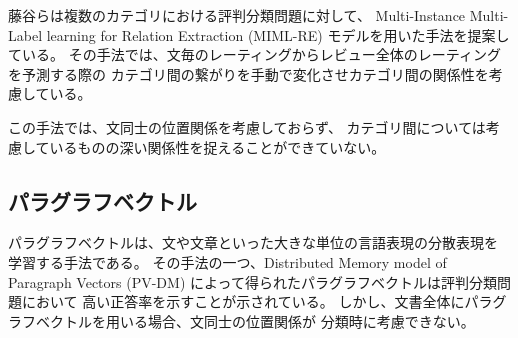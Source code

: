 \documentclass{ttisummary}
\begin{document}
藤谷ら\cite{fujitani15}は複数のカテゴリにおける評判分類問題に対して、
Multi-Instance Multi-Label learning for Relation Extraction (MIML-RE)
\cite{mihai12}モデルを用いた手法を提案している。
その手法では、文毎のレーティングからレビュー全体のレーティングを予測する際の
カテゴリ間の繋がりを手動で変化させカテゴリ間の関係性を考慮している。

この手法では、文同士の位置関係を考慮しておらず、
カテゴリ間については考慮しているものの深い関係性を捉えることができていない。


\subsection{パラグラフベクトル}

パラグラフベクトルは、文や文章といった大きな単位の言語表現の分散表現を
学習する手法である。
その手法の一つ、Distributed Memory model of Paragraph Vectors (PV-DM)
によって得られたパラグラフベクトルは評判分類問題において
高い正答率を示すことが示されている。
しかし、文書全体にパラグラフベクトルを用いる場合、文同士の位置関係が
分類時に考慮できない。
\end{document}

